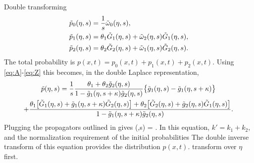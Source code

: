 Double transforming \DIFdelbegin {}%
\DIFdelend \DIFaddbegin {}\begin{align}
	\tilde{p}_0(\eta,s) &= \frac{1}{s}\tilde{\omega}_{0}(\eta,s),\\
	\tilde{p}_1(\eta,s) &= \theta_1 \tilde{G}_1(\eta,s) + \tilde{\omega}_2(\eta,s) \tilde{G}_1(\eta,s),\\
	\tilde{p}_2(\eta,s) &= \theta_2 \tilde{G}_2(\eta,s) + \tilde{\omega}_{1}(\eta,s)\tilde{G}_2(\eta,s).\label{eq:Z}
\end{align}\DIFaddend 
The total probability is $p(x,t) = p_0(x,t) + p_1(x,t) + p_2(x,t)$. Using \DIFdelbegin {}\DIFdelend \DIFaddbegin {}\DIFaddend \ref{eq:A}-\ref{eq:Z} \DIFdelbegin \DIFdel{) }\DIFdelend this becomes, in the double Laplace representation, 
\begin{multline}
	\tilde{p}(\eta,s) = \frac{1}{s}\frac{\theta_1 + \theta_2 \tilde{g}_2(\eta,s)}{1-\tilde{g}_1(\eta,s+\kappa)\tilde{g}_2(\eta,s)}\big\{\tilde{g}_1(\eta,s)-\tilde{g}_1(\eta,s+\kappa) \big\} \\
	+\frac{\theta_1\big[\tilde{G}_1(\eta,s) + \tilde{g}_1(\eta,s+\kappa)\tilde{G}_2(\eta,s)\big]+ \theta_2\big[\tilde{G}_2(\eta,s) + \tilde{g}_2(\eta,s)\tilde{G}_1(\eta,s)\big]}{1-\tilde{g}_1(\eta,s+\kappa)\tilde{g}_2(\eta,s)}. \\
	\label{eq:lap}
\end{multline}
Plugging the propagators outlined in \DIFdelbegin {}\DIFdelend \DIFaddbegin {}\DIFaddend gives 
\be {}(\eta,s) = .\label{eq:nicedist}\ee
In this equation, $k'=k_1+k_2$, and \DIFdelbegin {}\DIFdelend the normalization requirement of the initial probabilities \DIFdelbegin {}\DIFdelend \DIFaddbegin {}\DIFaddend The double inverse transform of this equation provides the distribution $p(x,t)$.
\DIFdelbegin {}\DIFdelend \DIFaddbegin {}\DIFaddend transform over $\eta$ \DIFaddbegin {}\DIFaddend first.
